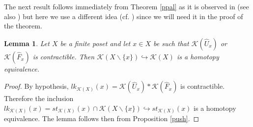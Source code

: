 \documentclass[11pt,twoside]{amsart}
\theoremstyle{plain}
\newtheorem{lema}{Lemma}[section]
\theoremstyle{remark}
\theoremstyle{definition}
\newcommand{\kp}{\mathcal{K}}
\begin{document}
The next result follows immediately from Theorem \ref{ppal} as it is observed in \cite[Proposition 6.1]{Wal} (see also \cite{BM}) but here we use a different idea (cf. \cite[Proposition 3.10]{BM4}) since we will need it in the proof of the theorem.

\begin{lema} \label{lema2}
Let $X$ be a finite poset and let $x\in X$ be such that $\kp(\hat{U}_x)$ or $\kp(\hat{F}_x)$ is contractible. Then $\kp(X\smallsetminus \{x\}) \hookrightarrow \kp(X)$ is a homotopy equivalence. 
\end{lema}
\begin{proof}
By hypothesis, $lk_{\kp (X)}(x)=\kp(\hat{U}_x)* \kp(\hat{F}_x)$ is contractible. Therefore the inclusion $lk_{\kp (X)}(x)=st_{\kp (X)}(x)\cap \kp (X\smallsetminus \{x\}) \hookrightarrow st_{\kp (X)}(x)$ is a homotopy equivalence. The lemma follows then from Proposition \ref{push}.
\end{proof}
\end{document}
